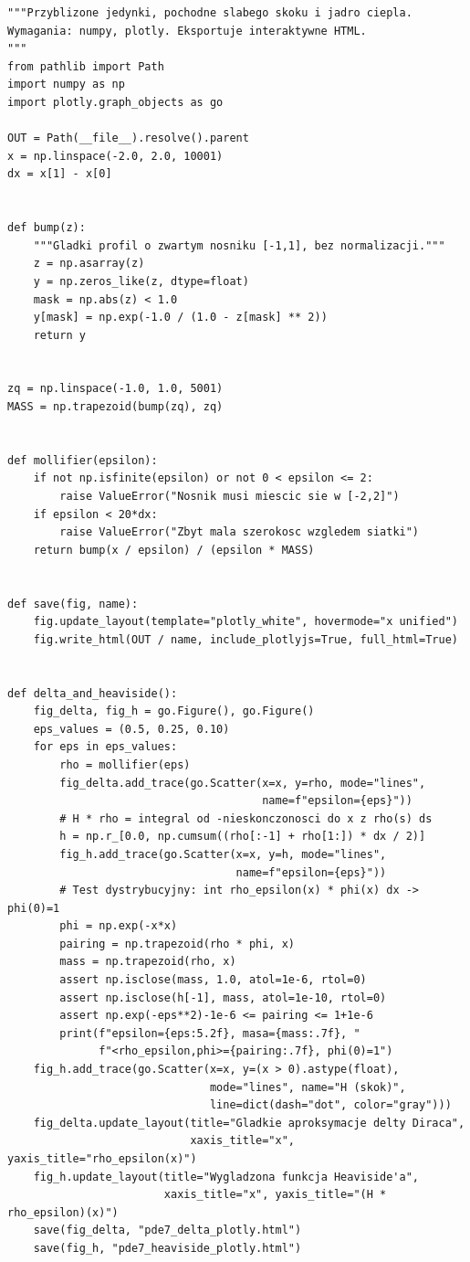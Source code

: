 \begin{lstlisting}[style=pythonpde,caption={Dystrybucje: przybliżone jedynki, funkcja Heaviside'a i jądro cieplne (Plotly)},label={code:pde-distributions}]
"""Przyblizone jedynki, pochodne slabego skoku i jadro ciepla.
Wymagania: numpy, plotly. Eksportuje interaktywne HTML.
"""
from pathlib import Path
import numpy as np
import plotly.graph_objects as go

OUT = Path(__file__).resolve().parent
x = np.linspace(-2.0, 2.0, 10001)
dx = x[1] - x[0]


def bump(z):
    """Gladki profil o zwartym nosniku [-1,1], bez normalizacji."""
    z = np.asarray(z)
    y = np.zeros_like(z, dtype=float)
    mask = np.abs(z) < 1.0
    y[mask] = np.exp(-1.0 / (1.0 - z[mask] ** 2))
    return y


zq = np.linspace(-1.0, 1.0, 5001)
MASS = np.trapezoid(bump(zq), zq)


def mollifier(epsilon):
    if not np.isfinite(epsilon) or not 0 < epsilon <= 2:
        raise ValueError("Nosnik musi miescic sie w [-2,2]")
    if epsilon < 20*dx:
        raise ValueError("Zbyt mala szerokosc wzgledem siatki")
    return bump(x / epsilon) / (epsilon * MASS)


def save(fig, name):
    fig.update_layout(template="plotly_white", hovermode="x unified")
    fig.write_html(OUT / name, include_plotlyjs=True, full_html=True)


def delta_and_heaviside():
    fig_delta, fig_h = go.Figure(), go.Figure()
    eps_values = (0.5, 0.25, 0.10)
    for eps in eps_values:
        rho = mollifier(eps)
        fig_delta.add_trace(go.Scatter(x=x, y=rho, mode="lines",
                                       name=f"epsilon={eps}"))
        # H * rho = integral od -nieskonczonosci do x z rho(s) ds
        h = np.r_[0.0, np.cumsum((rho[:-1] + rho[1:]) * dx / 2)]
        fig_h.add_trace(go.Scatter(x=x, y=h, mode="lines",
                                   name=f"epsilon={eps}"))
        # Test dystrybucyjny: int rho_epsilon(x) * phi(x) dx -> phi(0)=1
        phi = np.exp(-x*x)
        pairing = np.trapezoid(rho * phi, x)
        mass = np.trapezoid(rho, x)
        assert np.isclose(mass, 1.0, atol=1e-6, rtol=0)
        assert np.isclose(h[-1], mass, atol=1e-10, rtol=0)
        assert np.exp(-eps**2)-1e-6 <= pairing <= 1+1e-6
        print(f"epsilon={eps:5.2f}, masa={mass:.7f}, "
              f"<rho_epsilon,phi>={pairing:.7f}, phi(0)=1")
    fig_h.add_trace(go.Scatter(x=x, y=(x > 0).astype(float),
                               mode="lines", name="H (skok)",
                               line=dict(dash="dot", color="gray")))
    fig_delta.update_layout(title="Gladkie aproksymacje delty Diraca",
                            xaxis_title="x", yaxis_title="rho_epsilon(x)")
    fig_h.update_layout(title="Wygladzona funkcja Heaviside'a",
                        xaxis_title="x", yaxis_title="(H * rho_epsilon)(x)")
    save(fig_delta, "pde7_delta_plotly.html")
    save(fig_h, "pde7_heaviside_plotly.html")



\end{lstlisting}
